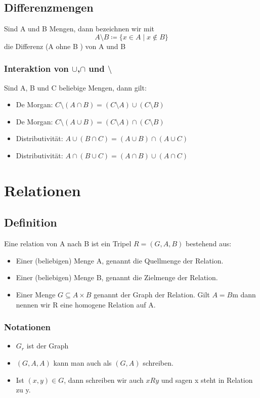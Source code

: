 \subsection{Differenzmengen}
Sind A und B Mengen, dann bezeichnen wir mit
\begin{equation}
    A \setminus B \coloneqq \{x \in A \mid x \notin B\}
\end{equation}
die Differenz (A ohne B ) von A und B
\subsubsection{Interaktion von $\cup$,$\cap$ und $\setminus$}
Sind A, B und C beliebige Mengen, dann gilt:
\begin{itemize}
    \item De Morgan: $C \setminus (A \cap B) = (C \setminus A) \cup (C \setminus B)$
    \item De Morgan: $C \setminus (A \cup B) = (C \setminus A) \cap (C \setminus B)$
    \item Distributivität: $A \cup (B \cap C) = (A \cup B) \cap (A \cup C)$
    \item Distributivität: $A \cap (B \cup C) = (A \cap B) \cup (A \cap C)$
\end{itemize}
\section{Relationen}
\subsection{Definition}
Eine relation von A nach B ist ein Tripel $R = (G,A,B)$ bestehend aus:
\begin{itemize}
    \item Einer (beliebigen) Menge A, genannt die Quellmenge der Relation.
    \item Einer (beliebigen) Menge B, genannt die Zielmenge der
    Relation.
    \item Einer Menge $G \subseteq A \times B$ genannt der Graph der Relation. Gilt $A = B$m dann 
    nennen wir R eine homogene Relation auf A.
\end{itemize}
\subsubsection{Notationen}
\begin{itemize}
    \item $G_r$ ist der Graph
    \item $(G,A,A)$ kann man auch als $(G,A)$ schreiben.
    \item Ist $(x,y) \in G$, dann schreiben wir auch $xRy$ und sagen x steht in Relation zu y.
\end{itemize}

